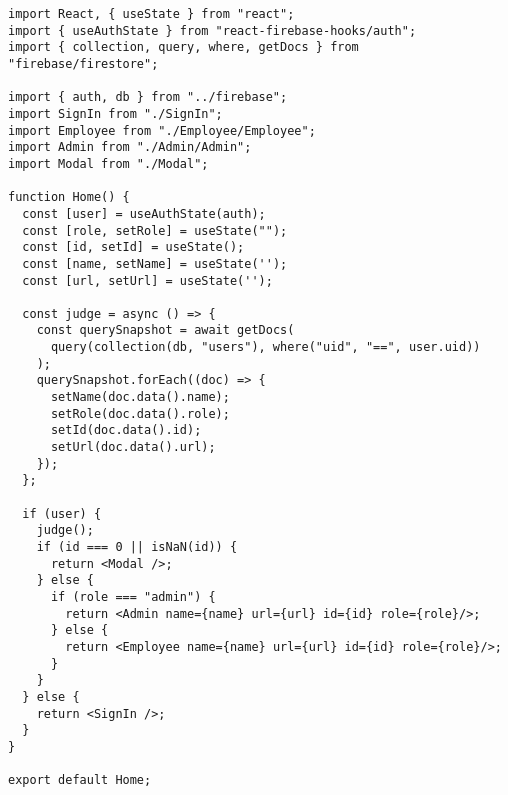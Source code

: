 \begin{verbatim}
import React, { useState } from "react";
import { useAuthState } from "react-firebase-hooks/auth";
import { collection, query, where, getDocs } from "firebase/firestore";

import { auth, db } from "../firebase";
import SignIn from "./SignIn";
import Employee from "./Employee/Employee";
import Admin from "./Admin/Admin";
import Modal from "./Modal";

function Home() {
  const [user] = useAuthState(auth);
  const [role, setRole] = useState("");
  const [id, setId] = useState();
  const [name, setName] = useState('');
  const [url, setUrl] = useState('');

  const judge = async () => {
    const querySnapshot = await getDocs(
      query(collection(db, "users"), where("uid", "==", user.uid))
    );
    querySnapshot.forEach((doc) => {
      setName(doc.data().name);
      setRole(doc.data().role);
      setId(doc.data().id);
      setUrl(doc.data().url);
    });
  };

  if (user) {
    judge();
    if (id === 0 || isNaN(id)) {
      return <Modal />;
    } else {
      if (role === "admin") {
        return <Admin name={name} url={url} id={id} role={role}/>;
      } else {
        return <Employee name={name} url={url} id={id} role={role}/>;
      }
    }
  } else {
    return <SignIn />;
  }
}

export default Home;

\end{verbatim}